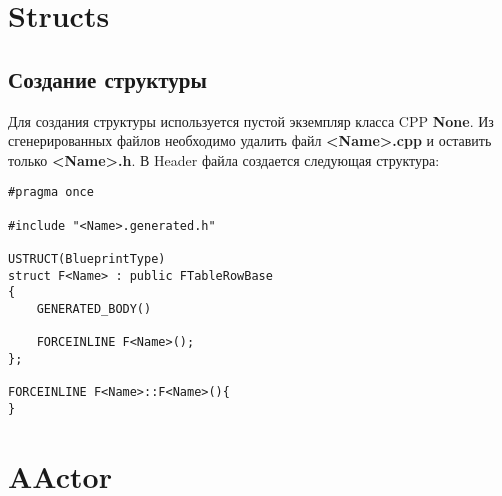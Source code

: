 \documentclass[a4paper,article,14pt]{extarticle}
\begin{document}
\tableofcontents
\pagebreak

\newpage
{}

\newpage
\section{Structs}
\subsection{Создание структуры}

Для создания структуры используется пустой экземпляр класса CPP \textbf{None}. Из сгенерированных файлов необходимо удалить файл \textbf{<Name>.cpp} и оставить только \textbf{<Name>.h}. В Header файла создается следующая структура:
\\
\lstset{language=C}          
\begin{lstlisting}           
#pragma once

#include "<Name>.generated.h"

USTRUCT(BlueprintType)
struct F<Name> : public FTableRowBase
{
	GENERATED_BODY()
    
	FORCEINLINE F<Name>();
};

FORCEINLINE F<Name>::F<Name>(){
}
\end{lstlisting}          

\newpage
\section{AActor}
\end{document}
